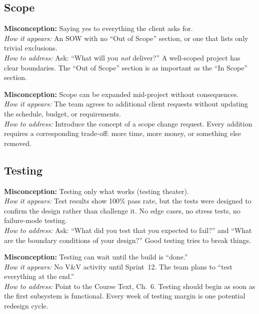 \subsection{Scope}

\begin{redflag}
\textbf{Misconception:} Saying yes to everything the client asks for.\\
\textit{How it appears:} An SOW with no ``Out of Scope'' section, or one that lists only trivial exclusions.\\
\textit{How to address:} Ask: ``What will you \emph{not} deliver?'' A well-scoped project has clear boundaries. The ``Out of Scope'' section is as important as the ``In Scope'' section.
\end{redflag}

\begin{redflag}
\textbf{Misconception:} Scope can be expanded mid-project without consequences.\\
\textit{How it appears:} The team agrees to additional client requests without updating the schedule, budget, or requirements.\\
\textit{How to address:} Introduce the concept of a scope change request. Every addition requires a corresponding trade-off: more time, more money, or something else removed.
\end{redflag}

\subsection{Testing}

\begin{redflag}
\textbf{Misconception:} Testing only what works (testing theater).\\
\textit{How it appears:} Test results show 100\% pass rate, but the tests were designed to confirm the design rather than challenge it. No edge cases, no stress tests, no failure-mode testing.\\
\textit{How to address:} Ask: ``What did you test that you expected to fail?'' and ``What are the boundary conditions of your design?'' Good testing tries to break things.
\end{redflag}

\begin{redflag}
\textbf{Misconception:} Testing can wait until the build is ``done.''\\
\textit{How it appears:} No V\&V activity until Sprint~12. The team plans to ``test everything at the end.''\\
\textit{How to address:} Point to the Course Text, Ch.~6. Testing should begin as soon as the first subsystem is functional. Every week of testing margin is one potential redesign cycle.
\end{redflag}

